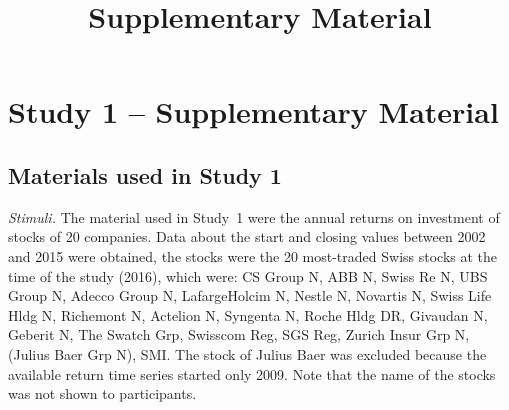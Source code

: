 \title{Supplementary Material}



\section{Study 1 -- Supplementary Material}
\subsection{Materials used in Study 1}
\label{sup:study1_material}
\textit{Stimuli.} The material used in Study~1 were the annual returns on investment of stocks of 20 companies. Data about the start and closing values between 2002 and 2015 were obtained, the stocks were the 20 most-traded Swiss stocks at the time of the study (2016), which were: CS Group N,
ABB N,
Swiss Re N,
UBS Group N,
Adecco Group N,
LafargeHolcim N,
Nestle N,
Novartis N,
Swiss Life Hldg N,
Richemont N,
Actelion N,
Syngenta N,
Roche Hldg DR,
Givaudan N,
Geberit N,
The Swatch Grp,
Swisscom Reg,
SGS Reg,
Zurich Insur Grp N,
(Julius Baer Grp N),
SMI.
The stock of Julius Baer was excluded because the available return time series started only 2009. Note that the name of the stocks was not shown to participants. 

